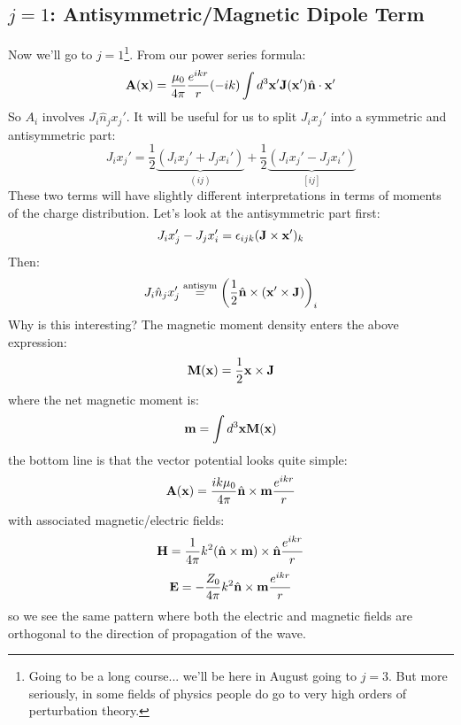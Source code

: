 \subsection{$j=1$: Antisymmetric/Magnetic Dipole Term}
Now we'll go to $j=1$\footnote{Going to be a long course... we'll be here in August going to $j = 3$. But more seriously, in some fields of physics people do go to very high orders of perturbation theory.}. From our power series formula:
\begin{equation}
    \mathbf{A}(\mathbf{x}) = \frac{\mu_0}{4\pi}\frac{e^{ikr}}{r}(-ik)\int d^3\mathbf{x}'\mathbf{J}(\mathbf{x}')\hat{\mathbf{n}}\cdot\mathbf{\mathbf{x}}'
\end{equation}
So $A_i$ involves $J_i \hat{n}_jx_j'$. It will be useful for us to split $J_ix_j'$ into a symmetric and antisymmetric part:
\begin{equation}
    J_ix_j' = \frac{1}{2}\underbrace{(J_ix_j' + J_jx_i')}_{(ij)} + \frac{1}{2}\underbrace{(J_ix_j' - J_jx_i')}_{[ij]}
\end{equation}
These two terms will have slightly different interpretations in terms of moments of the charge distribution. Let's look at the antisymmetric part first:
\begin{equation}
    J_ix_j' - J_jx_i' = \epsilon_{ijk}(\mathbf{J}\times \mathbf{x}')_k
\end{equation}
Then:
\begin{equation}
    J_i \hat{n}_jx_j' \stackrel{\text{antisym}}{=} \left(\frac{1}{2}\hat{\mathbf{n}} \times (\mathbf{x}' \times \mathbf{J})\right)_i
\end{equation}
Why is this interesting? The magnetic moment density enters the above expression:
\begin{equation}
    \mathbf{M}(\mathbf{x}) = \frac{1}{2}\mathbf{x}\times\mathbf{J}
\end{equation}
where the net magnetic moment is:
\begin{equation}
    \mathbf{m} = \int d^3\mathbf{x}\mathbf{M}(\mathbf{x})
\end{equation}
the bottom line is that the vector potential looks quite simple:
\begin{equation}
    \mathbf{A}(\mathbf{x}) = \frac{ik\mu_0}{4\pi}\hat{\mathbf{n}}\times\mathbf{m}\frac{e^{ikr}}{r}
\end{equation}
with associated magnetic/electric fields:
\begin{equation}
    \mathbf{H} = \frac{1}{4\pi}k^2(\hat{\mathbf{n}} \times \mathbf{m})\times \hat{\mathbf{n}}\frac{e^{ikr}}{r}
\end{equation}
\begin{equation}
    \mathbf{E} = - \frac{Z_0}{4\pi}k^2\hat{\mathbf{n}}\times \mathbf{m}\frac{e^{ikr}}{r}
\end{equation}
so we see the same pattern where both the electric and magnetic fields are orthogonal to the direction of propagation of the wave.

